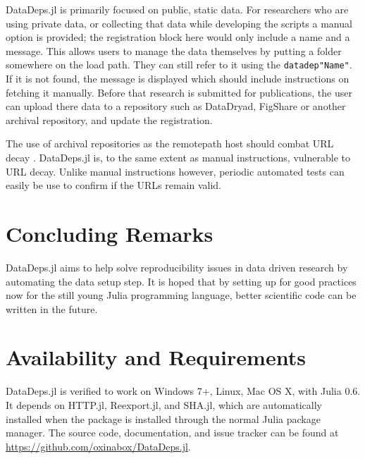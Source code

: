 \documentclass[twoside,11pt]{article}
\newcommand{\datadep}[1]{\texttt{datadep"{}#1"{}}}
\begin{document}
DataDeps.jl is primarily focused on public, static data.
For researchers who are using private data, or collecting that data while developing the scripts a manual option is provided; the registration block here would only include a name and a message. This allows users to manage the data themselves by putting a folder somewhere on the load path. They can still refer to it using the \datadep{Name}. If it is not found, the message is displayed which should include instructions on fetching it manually.
Before that research is submitted for publications, the user can upload there data to a repository such as DataDryad, FigShare or another archival repository, and update the registration.

The use of archival repositories as the remotepath host should combat URL decay \citep{wren2008url}. DataDeps.jl is, to the same extent as manual instructions, vulnerable to URL decay.
Unlike manual instructions however, periodic automated tests can easily be use to confirm if the URLs remain valid.

\section {Concluding Remarks}
DataDeps.jl aims to help solve reproducibility issues in data driven research by automating the data setup step.
It is hoped that by setting up for good practices now for the still young Julia programming language, better scientific code can be written in the future.



\section{Availability and Requirements}
DataDeps.jl is verified to work on  Windows 7+, Linux, Mac OS X, with Julia 0.6.
It depends on HTTP.jl, Reexport.jl, and SHA.jl, which are automatically installed when the package is installed through the normal Julia package manager.
The source code, documentation, and issue tracker can be found at \url{https://github.com/oxinabox/DataDeps.jl}.

\vskip 0.2in

\end{document}
